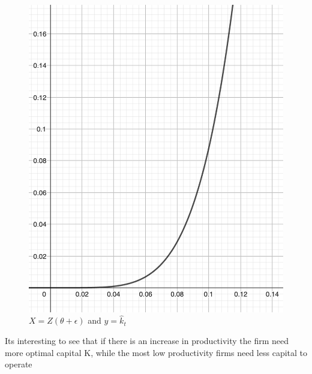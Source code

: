 \documentclass{article}
\begin{document}
\begin{figure}
    \centering
    \includegraphics[scale = 0.8]{K.png}
    \caption{\(X=Z(\theta +\epsilon)\) and \(y=\widehat{k} _t\) }
    \label{plot:k_static}
\end{figure}
Its interesting to see that if there is an increase in productivity the firm need more optimal capital K, while the most
low productivity firms need less capital to operate 
\end{document}
